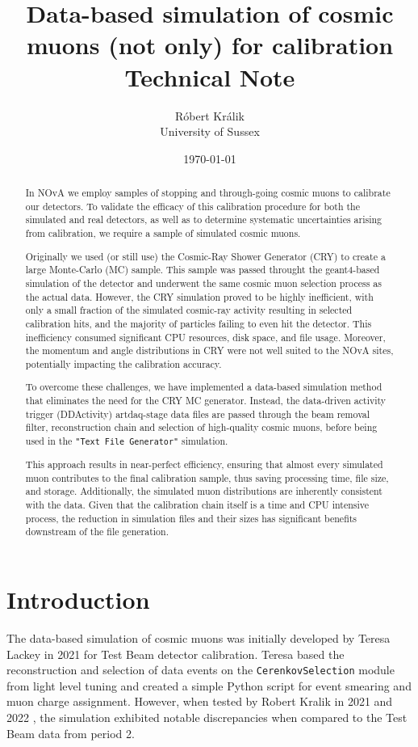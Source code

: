 \documentclass[12pt]{article}
\author{Róbert Králik\\\small{University of Sussex}}
\title{\textbf{Data-based simulation of cosmic muons (not only) for calibration\\ \vspace*{5mm}
\Large{Technical Note}}}
\date{\today}
\begin{document}
\maketitle
\begin{abstract}
In NOvA we employ samples of stopping and through-going cosmic muons to calibrate our detectors. To validate the efficacy of this calibration procedure for both the simulated and real detectors, as well as to determine systematic uncertainties arising from calibration, we require a sample of simulated cosmic muons.

Originally we used (or still use) the Cosmic-Ray Shower Generator (CRY) \cite{CRY} to create a large Monte-Carlo (MC) sample. This sample was passed throught the geant4-based \cite{GEANT4} simulation of the detector and underwent the same cosmic muon selection process as the actual data. However, the CRY simulation proved to be highly inefficient, with only a small fraction of the simulated cosmic-ray activity resulting in selected calibration hits, and the majority of particles failing to even hit the detector. This inefficiency consumed significant CPU resources, disk space, and file usage. Moreover, the momentum and angle distributions in CRY were not well suited to the NOvA sites, potentially impacting the calibration accuracy.

To overcome these challenges, we have implemented a data-based simulation method that eliminates the need for the CRY MC generator. Instead, the data-driven activity trigger (DDActivity) artdaq-stage data files are passed through the beam removal filter, reconstruction chain and selection of high-quality cosmic muons, before being used in the \texttt{"Text File Generator"} simulation.

This approach results in near-perfect efficiency, ensuring that almost every simulated muon contributes to the final calibration sample, thus saving processing time, file size, and storage. Additionally, the simulated muon distributions are inherently consistent with the data. Given that the calibration chain itself is a time and CPU intensive process, the reduction in simulation files and their sizes has significant benefits downstream of the file generation.
\end{abstract}

\newpage
\tableofcontents

\section{Introduction}
The data-based simulation of cosmic muons was initially developed by Teresa Lackey \cite{LackeyThesis} in 2021 for Test Beam detector calibration. Teresa based the reconstruction and selection of data events on the \texttt{CerenkovSelection} module from light level tuning and created a simple Python script for event smearing and muon charge assignment. However, when tested by Robert Kralik in 2021 and 2022 \cite{NOVA-doc-54417-v1}, the simulation exhibited notable discrepancies when compared to the Test Beam data from period 2.
\end{document}
